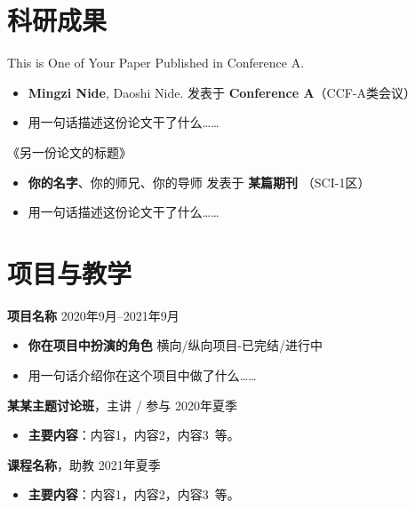 \documentclass[11pt]{article}
\newlength{\iconwidth}
\begin{document}
    \begin{minipage}[t]{\textwidth}
    \section[科研成果]{\quad 科研成果}

    This is One of Your Paper Published in Conference A.
    \begin{itemize}
        \item \textbf{Mingzi Nide}, Daoshi Nide. \hfill 发表于 \textbf{Conference A}（CCF-A类会议）
        \item 用一句话描述这份论文干了什么\dots\dots
    \end{itemize}

    \vspace{0.5em}
    《另一份论文的标题》
    \begin{itemize}
        \item  \textbf{你的名字}、你的师兄、你的导师 \hfill 发表于 \textbf{某篇期刊} （SCI-1区）
        \item 用一句话描述这份论文干了什么\dots\dots
    \end{itemize}
    
    \vspace{1.2em}
    \end{minipage}

    \begin{minipage}[t]{\textwidth}
    \section[项目与教学]{\quad 项目与教学}
    
    {\large \textbf{项目名称}} \hfill 2020年9月--2021年9月
    \begin{itemize}
        \item \textbf{你在项目中扮演的角色} \hfill 横向/纵向项目-已完结/进行中
        \item 用一句话介绍你在这个项目中做了什么\dots\dots
    \end{itemize}

    \vspace{0.5em}
    {\large \textbf{某某主题讨论班}}，主讲 / 参与 \hfill 2020年夏季
    \begin{itemize}
        \item \textbf{主要内容}：内容1，内容2，内容3\ 等。
    \end{itemize}

    \vspace{0.5em}
    {\large \textbf{课程名称}}，助教 \hfill 2021年夏季
    \begin{itemize}
        \item \textbf{主要内容}：内容1，内容2，内容3\ 等。
    \end{itemize}
    
    \vspace{1.2em}
    \end{minipage}
    
\end{document}
